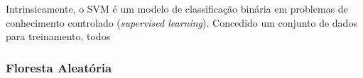 Intrinsicamente, o SVM é um modelo de classificação binária em problemas de conhecimento controlado (\textit{supervised learning}). Concedido um conjunto de dados para treinamento, todos


\subsubsection{Floresta Aleatória}
